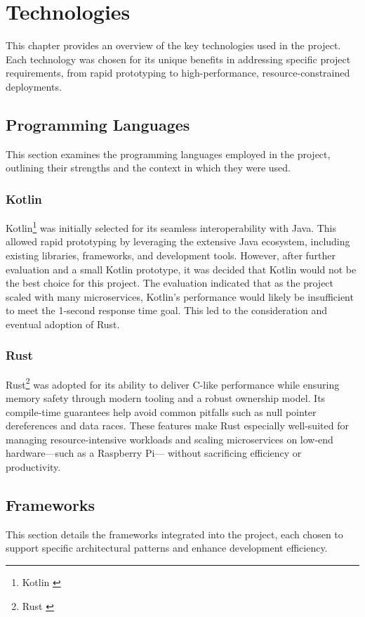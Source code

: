 \renewcommand*\chapterpagestyle{scrheadings}
\chapter{Technologies}

This chapter provides an overview of the key
technologies used in the project.
Each technology was chosen for its unique benefits in
addressing specific project requirements, from rapid
prototyping to high-performance, resource-constrained deployments.

\section{Programming Languages}
This section examines the programming languages employed
in the project,
outlining their strengths and the context in which they
were used.

\subsection{Kotlin}
Kotlin\footnote{Kotlin \cite{kotlin}} was initially selected
for its seamless interoperability with Java.
This allowed rapid prototyping by leveraging the extensive
Java ecosystem, including existing libraries, frameworks,
and development tools.
However, after further evaluation and a small Kotlin prototype,
it was decided that Kotlin would not be the best choice for this project.
The evaluation indicated that as the project scaled with many microservices,
Kotlin's performance would likely be insufficient to meet the 1-second response time goal.
This led to the consideration and eventual adoption of Rust.

\subsection{Rust}
Rust\footnote{Rust \cite{rust}} was adopted for its ability to
deliver C-like performance
while ensuring memory safety through modern tooling and a robust
ownership model.
Its compile-time guarantees help avoid common pitfalls such as
null pointer dereferences and data races.
These features make Rust especially well-suited for managing
resource-intensive workloads
and scaling microservices on low-end hardware---such as a Raspberry Pi---
without sacrificing efficiency or productivity.

\section{Frameworks}
This section details the frameworks integrated into the project,
each chosen to support specific architectural patterns and
enhance development efficiency.

